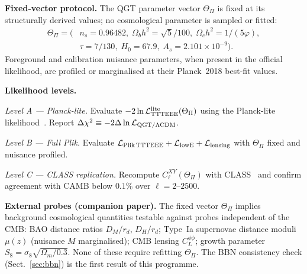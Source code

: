 \documentclass[twocolumn,10pt]{article}
\newcommand{\vp}{\varphi}
\begin{document}
\medskip
\noindent\textbf{Fixed-vector protocol.}
The QGT parameter vector $\Theta_\Pi$ is fixed at its structurally
derived values; no cosmological parameter is sampled or fitted:
\begin{align*}
  \Theta_\Pi = \bigl(&n_s=0.96482,\;
  \Omega_bh^2=\sqrt{5}/100,\;
  \Omega_ch^2=1/(5\vp),\\
  &\tau=7/130,\;
  H_0=67.9,\;
  A_s=2.101\times10^{-9}\bigr).
\end{align*}
Foreground and calibration nuisance parameters, when present in the
official likelihood, are profiled or marginalised at their
Planck~2018 best-fit values.

\medskip
\noindent\textbf{Likelihood levels.}

\noindent\textit{Level A — Planck-lite.}
Evaluate $-2\ln\mathcal{L}_{\rm TTTEEE}^{\rm lite}(\Theta_\Pi)$
using the Planck-lite likelihood~\cite{Planck2018V}.
Report $\Delta\chi^2 \equiv -2\Delta\ln\mathcal{L}_{\rm QGT/\Lambda CDM}$.

\noindent\textit{Level B — Full Plik.}
Evaluate $\mathcal{L}_{\rm Plik\,TTTEEE} + \mathcal{L}_{\rm lowE}
+ \mathcal{L}_{\rm lensing}$ with $\Theta_\Pi$ fixed and nuisance
profiled.

\noindent\textit{Level C — CLASS replication.}
Recompute $C_\ell^{XY}(\Theta_\Pi)$ with CLASS~\cite{Lesgourgues2011}
and confirm agreement with CAMB below $0.1\%$ over $\ell=2$--$2500$.

\medskip
\noindent\textbf{External probes (companion paper).}
The fixed vector $\Theta_\Pi$ implies background cosmological
quantities testable against probes independent of the CMB:
BAO distance ratios $D_M/r_d$, $D_H/r_d$;
Type~Ia supernovae distance moduli $\mu(z)$ (nuisance $M$ marginalised);
CMB lensing $C_L^{\phi\phi}$;
growth parameter $S_8=\sigma_8\sqrt{\Omega_m/0.3}$.
None of these require refitting $\Theta_\Pi$.
The BBN consistency check (Sect.~\ref{sec:bbn}) is the first
result of this programme.
\end{document}

